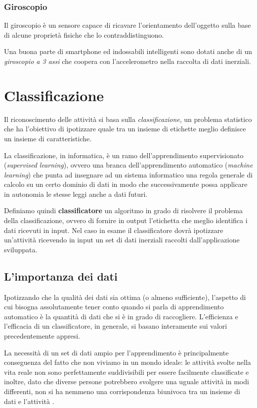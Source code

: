 \subsubsection{Giroscopio}
Il giroscopio è un sensore capace di ricavare l'orientamento dell'oggetto sulla base di alcune proprietà fisiche che lo contraddistinguono.

Una buona parte di smartphone ed indossabili intelligenti sono dotati anche di un \textit{giroscopio a 3 assi} che coopera 
con l'accelerometro nella raccolta di dati inerziali.

\section{Classificazione}
Il riconoscimento delle attività si basa sulla \textit{classificazione}, un problema statistico che ha l'obiettivo di ipotizzare 
quale tra un insieme di etichette meglio definisce un insieme di caratteristiche. 

La classificazione, in informatica, è un ramo dell'apprendimento supervisionato (\textit{supervised learning}),
ovvero una branca dell'apprendimento automatico (\textit{machine learning}) che punta ad insegnare ad un sistema informatico una regola generale
di calcolo su un certo dominio di dati in modo che successivamente possa applicare in autonomia le stesse leggi anche a dati futuri.

Definiamo quindi \textbf{classificatore} un algoritmo in grado di risolvere il problema della classificazione, ovvero di fornire in output 
l'etichetta che meglio identifica i dati ricevuti in input.
Nel caso in esame il classificatore dovrà ipotizzare un'attività ricevendo in input un set di dati inerziali 
raccolti dall'applicazione sviluppata.

\subsection{L'importanza dei dati}
Ipotizzando che la qualità dei dati sia ottima (o almeno sufficiente), l'aspetto di cui bisogna assolutamente tener conto quando 
si parla di apprendimento automatico è la quantità di dati che si è in grado di raccogliere. 
L'efficienza e l'efficacia di un classificatore, in generale, si basano interamente sui valori precedentemente appresi.

La necessità di un set di dati ampio per l'apprendimento è principalmente conseguenza del fatto che non viviamo in un mondo ideale: 
le attività svolte nella vita reale non sono perfettamente suddivisibili per essere facilmente classificate e inoltre, dato che diverse persone
potrebbero svolgere una uguale attività in modi differenti, non si ha nemmeno una corrispondenza biunivoca tra un insieme di dati e l'attività \cite{framework_long_term_data_har}.


